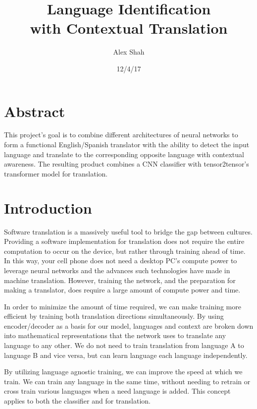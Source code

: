 \documentclass[10pt,a4paper]{article}
\begin{document}
\title{Language Identification \\ with Contextual Translation}
\author{Alex Shah}
\date{12/4/17}

\maketitle

\section{Abstract}
   This project's goal is to combine different architectures of neural networks to form a functional English/Spanish translator with the ability to detect the input language and translate to the corresponding opposite language with contextual awareness. The resulting product combines a CNN classifier with tensor2tensor's transformer model for translation.

\section{Introduction}
  Software translation is a massively useful tool to bridge the gap between cultures. Providing a software implementation for translation does not require the entire computation to occur on the device, but rather through training ahead of time. In this way, your cell phone does not need a desktop PC's compute power to leverage neural networks and the advances such technologies have made in machine translation. However, training the network, and the preparation for making a translator, does require a large amount of compute power and time.

  In order to minimize the amount of time required, we can make training more efficient by training both translation directions simultaneously. By using encoder/decoder as a basis for our model, languages and context are broken down into mathematical representations that the network uses to translate any language to any other. We do not need to train translation from language A to language B and vice versa, but can learn language each language independently.

  By utilizing language agnostic training, we can improve the speed at which we train. We can train any language in the same time, without needing to retrain or cross train various languages when a need language is added. This concept applies to both the classifier and for translation. 

\clearpage
\end{document}
